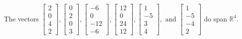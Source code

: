 \begin{exercise}
\begin{exerciseStatement}
  \end{exerciseStatement}
  \begin{exerciseAnswer}
   The vectors \(\left[\begin{array}{r}
2 \\
0 \\
4 \\
2
\end{array}\right] , \left[\begin{array}{r}
0 \\
2 \\
0 \\
3
\end{array}\right] , \left[\begin{array}{r}
-6 \\
0 \\
-12 \\
-6
\end{array}\right] , \left[\begin{array}{r}
12 \\
0 \\
24 \\
12
\end{array}\right] , \left[\begin{array}{r}
1 \\
-5 \\
3 \\
4
\end{array}\right] , \text{ and } \left[\begin{array}{r}
1 \\
-5 \\
-4 \\
2
\end{array}\right]\) 
  	 do  
	span \(\mathbb{R}^4\).
  


  \end{exerciseAnswer}
\end{exercise}